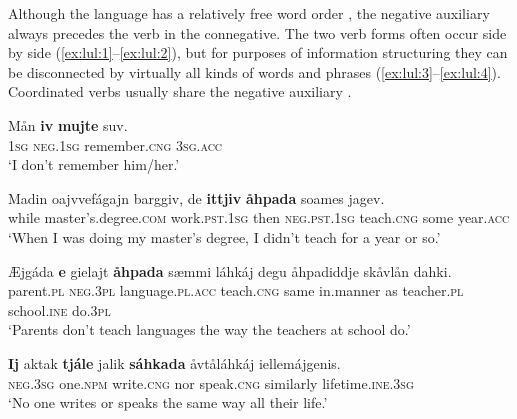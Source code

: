 \documentclass[output=paper,colorlinks,citecolor=brown]{langscibook}
\begin{document}
Although the language has a relatively free word order \citep{Mikkelsen2011}, the negative auxiliary always precedes the verb in the connegative. The two verb forms often occur side by side (\ref{ex:lul:1}--\ref{ex:lul:2}), but for purposes of information structuring they can be disconnected by virtually all kinds of words and phrases (\ref{ex:lul:3}--\ref{ex:lul:4}). Coordinated verbs usually share the negative auxiliary .

\ea\label{ex:lul:1} 
    \gll Mån \textbf{iv} \textbf{mujte} suv. \\ 
         \textsc{1sg} \textsc{neg.1sg} remember.\textsc{cng} \textsc{3sg.acc} \\
    \glt  ‘I don’t remember him/her.’ \citep{SIKOR2021}
\z 

\ea\label{ex:lul:2} 
    \gll Madin oajvvefágajn barggiv, de \textbf{ittjiv} \textbf{åhpada} soames jagev. \\ 
          while master’s.degree.\textsc{com} work.\textsc{pst}.\textsc{1sg} then \textsc{neg.pst.1sg} teach.\textsc{cng} some year.\textsc{acc}\\
    \glt ‘When I was doing my master’s degree, I didn’t teach for a year or so.’ \citep{SIKOR2021}
\z 

\ea\label{ex:lul:3} 
    \gll Æjgáda \textbf{e} gielajt \textbf{åhpada} sæmmi láhkáj degu åhpadiddje skåvlån dahki. \\ 
         parent.\textsc{pl} \textsc{neg.3pl} language.\textsc{pl.acc} teach.\textsc{cng} same in.manner as teacher.\textsc{pl} school.\textsc{ine} do.\textsc{3pl}\\
    \glt  ‘Parents don’t teach languages the way the teachers at school do.’ \citep{SIKOR2021}
\z 
 
\ea\label{ex:lul:4} 
    \gll \textbf{Ij} aktak \textbf{tjále} jalik \textbf{sáhkada} åvtåláhkáj iellemájgenis. \\ 
         \textsc{neg.3sg} one.\textsc{npm} write.\textsc{cng} nor speak.\textsc{cng} similarly lifetime.\textsc{ine.3sg} \\
    \glt ‘No one writes or speaks the same way all their life.’ \citep{SIKOR2021}
\z 
\end{document}
